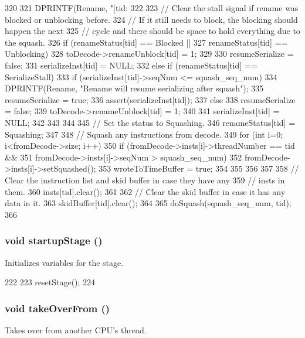 \begin{DoxyCode}
320 {
321     DPRINTF(Rename, "[tid:%
322 
323     // Clear the stall signal if rename was blocked or unblocking before.
324     // If it still needs to block, the blocking should happen the next
325     // cycle and there should be space to hold everything due to the squash.
326     if (renameStatus[tid] == Blocked ||
327         renameStatus[tid] == Unblocking) {
328         toDecode->renameUnblock[tid] = 1;
329 
330         resumeSerialize = false;
331         serializeInst[tid] = NULL;
332     } else if (renameStatus[tid] == SerializeStall) {
333         if (serializeInst[tid]->seqNum <= squash_seq_num) {
334             DPRINTF(Rename, "Rename will resume serializing after squash\n");
335             resumeSerialize = true;
336             assert(serializeInst[tid]);
337         } else {
338             resumeSerialize = false;
339             toDecode->renameUnblock[tid] = 1;
340 
341             serializeInst[tid] = NULL;
342         }
343     }
344 
345     // Set the status to Squashing.
346     renameStatus[tid] = Squashing;
347 
348     // Squash any instructions from decode.
349     for (int i=0; i<fromDecode->size; i++) {
350         if (fromDecode->insts[i]->threadNumber == tid &&
351             fromDecode->insts[i]->seqNum > squash_seq_num) {
352             fromDecode->insts[i]->setSquashed();
353             wroteToTimeBuffer = true;
354         }
355 
356     }
357 
358     // Clear the instruction list and skid buffer in case they have any
359     // insts in them.
360     insts[tid].clear();
361 
362     // Clear the skid buffer in case it has any data in it.
363     skidBuffer[tid].clear();
364 
365     doSquash(squash_seq_num, tid);
366 }
\end{DoxyCode}
\hypertarget{classDefaultRename_a31d4cbdab16d4ff8d6bc7f84ece727da}{
\subsubsection[{startupStage}]{\setlength{\rightskip}{0pt plus 5cm}void startupStage ()}}
\label{classDefaultRename_a31d4cbdab16d4ff8d6bc7f84ece727da}
Initializes variables for the stage. 


\begin{DoxyCode}
222 {
223     resetStage();
224 }
\end{DoxyCode}
\hypertarget{classDefaultRename_a8674059ce345e23aac5086b2c3e24a43}{
\subsubsection[{takeOverFrom}]{\setlength{\rightskip}{0pt plus 5cm}void takeOverFrom ()}}
\label{classDefaultRename_a8674059ce345e23aac5086b2c3e24a43}
Takes over from another CPU's thread. 


